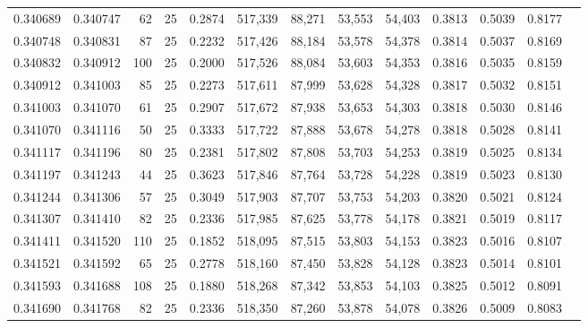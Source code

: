 \begin{tabular}{rrrrrrrrrrrrr}
0.340689 & 0.340747 &    62 &  25 &                                     0.2874 & 517,339 &  88,271 &  53,553 &  54,403 & 0.3813 & 0.5039 & 0.8177 \\
0.340748 & 0.340831 &    87 &  25 &                                     0.2232 & 517,426 &  88,184 &  53,578 &  54,378 & 0.3814 & 0.5037 & 0.8169 \\
0.340832 & 0.340912 &   100 &  25 &                                     0.2000 & 517,526 &  88,084 &  53,603 &  54,353 & 0.3816 & 0.5035 & 0.8159 \\
0.340912 & 0.341003 &    85 &  25 &                                     0.2273 & 517,611 &  87,999 &  53,628 &  54,328 & 0.3817 & 0.5032 & 0.8151 \\
0.341003 & 0.341070 &    61 &  25 &                                     0.2907 & 517,672 &  87,938 &  53,653 &  54,303 & 0.3818 & 0.5030 & 0.8146 \\
0.341070 & 0.341116 &    50 &  25 &                                     0.3333 & 517,722 &  87,888 &  53,678 &  54,278 & 0.3818 & 0.5028 & 0.8141 \\
0.341117 & 0.341196 &    80 &  25 &                                     0.2381 & 517,802 &  87,808 &  53,703 &  54,253 & 0.3819 & 0.5025 & 0.8134 \\
0.341197 & 0.341243 &    44 &  25 &                                     0.3623 & 517,846 &  87,764 &  53,728 &  54,228 & 0.3819 & 0.5023 & 0.8130 \\
0.341244 & 0.341306 &    57 &  25 &                                     0.3049 & 517,903 &  87,707 &  53,753 &  54,203 & 0.3820 & 0.5021 & 0.8124 \\
0.341307 & 0.341410 &    82 &  25 &                                     0.2336 & 517,985 &  87,625 &  53,778 &  54,178 & 0.3821 & 0.5019 & 0.8117 \\
0.341411 & 0.341520 &   110 &  25 &                                     0.1852 & 518,095 &  87,515 &  53,803 &  54,153 & 0.3823 & 0.5016 & 0.8107 \\
0.341521 & 0.341592 &    65 &  25 &                                     0.2778 & 518,160 &  87,450 &  53,828 &  54,128 & 0.3823 & 0.5014 & 0.8101 \\
0.341593 & 0.341688 &   108 &  25 &                                     0.1880 & 518,268 &  87,342 &  53,853 &  54,103 & 0.3825 & 0.5012 & 0.8091 \\
0.341690 & 0.341768 &    82 &  25 &                                     0.2336 & 518,350 &  87,260 &  53,878 &  54,078 & 0.3826 & 0.5009 & 0.8083 \\

\end{tabular}
